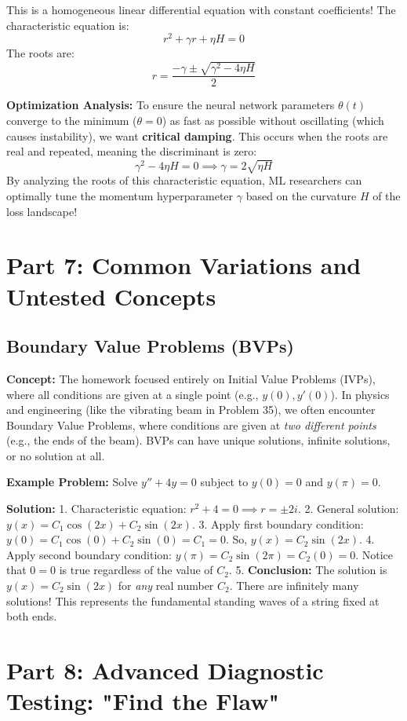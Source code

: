 \documentclass[11pt]{article}
\begin{document}
This is a homogeneous linear differential equation with constant coefficients!
The characteristic equation is:
\[ r^2 + \gamma r + \eta H = 0 \]
The roots are:
\[ r = \frac{-\gamma \pm \sqrt{\gamma^2 - 4\eta H}}{2} \]

\textbf{Optimization Analysis:}
To ensure the neural network parameters $\theta(t)$ converge to the minimum ($\theta = 0$) as fast as possible without oscillating (which causes instability), we want \textbf{critical damping}. This occurs when the roots are real and repeated, meaning the discriminant is zero:
\[ \gamma^2 - 4\eta H = 0 \implies \gamma = 2\sqrt{\eta H} \]
By analyzing the roots of this characteristic equation, ML researchers can optimally tune the momentum hyperparameter $\gamma$ based on the curvature $H$ of the loss landscape!

\newpage
\section{Part 7: Common Variations and Untested Concepts}

\subsection{Boundary Value Problems (BVPs)}
\textbf{Concept:} The homework focused entirely on Initial Value Problems (IVPs), where all conditions are given at a single point (e.g., $y(0), y'(0)$). In physics and engineering (like the vibrating beam in Problem 35), we often encounter Boundary Value Problems, where conditions are given at \textit{two different points} (e.g., the ends of the beam). BVPs can have unique solutions, infinite solutions, or no solution at all.

\textbf{Example Problem:} Solve $y'' + 4y = 0$ subject to $y(0) = 0$ and $y(\pi) = 0$.

\textbf{Solution:}
1. Characteristic equation: $r^2 + 4 = 0 \implies r = \pm 2i$.
2. General solution: $y(x) = C_1 \cos(2x) + C_2 \sin(2x)$.
3. Apply first boundary condition: $y(0) = C_1 \cos(0) + C_2 \sin(0) = C_1 = 0$.
   So, $y(x) = C_2 \sin(2x)$.
4. Apply second boundary condition: $y(\pi) = C_2 \sin(2\pi) = C_2(0) = 0$.
   Notice that $0 = 0$ is true regardless of the value of $C_2$.
5. \textbf{Conclusion:} The solution is $y(x) = C_2 \sin(2x)$ for \textit{any} real number $C_2$. There are infinitely many solutions! This represents the fundamental standing waves of a string fixed at both ends.

\section{Part 8: Advanced Diagnostic Testing: "Find the Flaw"}
\end{document}
